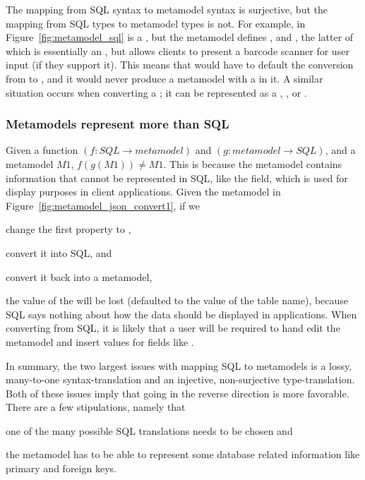 The mapping from SQL syntax to metamodel syntax is surjective, but the
mapping from SQL types to metamodel types is not. For example,  in
Figure~\ref{fig:metamodel_sql} is a , but the metamodel defines
, and , the latter of which is essentially an
, but allows clients to present a barcode scanner for user input (if
they support it). This means that  would have to default the conversion
from  to , and it would never produce a metamodel with
a  in it. A similar situation occurs when converting a
; it can be represented as a , , or
.


\subsubsection{Metamodels represent more than SQL}  \label{sec:}


Given a function $(f:SQL \rightarrow metamodel)$ and \mbox{$(g:metamodel
\rightarrow SQL)$}, and a metamodel $M1$, $f(g(M1)) \neq M1$.
This is because the metamodel contains information that cannot be
represented in SQL, like the  field, which is used for display
purposes in client applications. Given the metamodel in
Figure~\ref{fig:metamodel_json_convert1}, if we
\begin{inparaenum}
\item change the first  property to ,
\item convert it into SQL, and
\item convert it back into a metamodel,
\end{inparaenum}
the value of the  will be lost (defaulted to the value of the table
name), because SQL says nothing about how the data should be displayed in
applications. When converting from SQL, it is likely that a
user will be required to hand edit the metamodel and insert values for fields
like .

In summary, the two largest issues with mapping SQL to metamodels is a lossy,
many-to-one syntax-translation and an injective, non-surjective type-translation.
Both of these issues imply that going in the reverse direction is more
favorable. There are a few stipulations, namely that 
\begin{inparaenum} 
\item one of the many possible SQL translations needs to be chosen and
\item the metamodel has to be able to represent some database related information
like primary and foreign keys.
\end{inparaenum}


